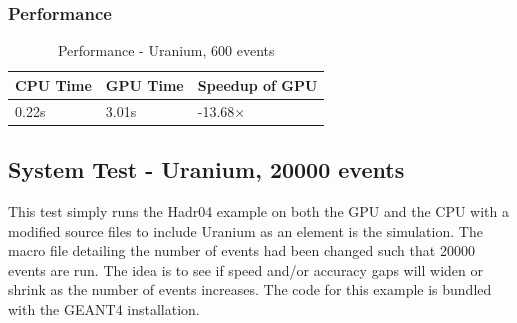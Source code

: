 \documentclass[12pt]{article}
\begin{document}
	\subsubsection{Performance}
		\begin{table}[H]
		\centering
		\caption{Performance - Uranium, 600 events}\label{sys4Perf}
		\begin{tabular}{lll}
		\toprule
		CPU Time& GPU Time&Speedup of GPU\\\midrule
		0.22s&3.01s&-13.68$\times$\\\bottomrule
		\end{tabular}
		\end{table}

\subsection{System Test - Uranium, 20000 events}
This test simply runs the Hadr04 example on both the GPU and the CPU with a modified source files to include Uranium as an element is the simulation. The macro file detailing the number of events had been changed such that 20000 events are run. The idea is to see if speed and/or accuracy gaps will widen or shrink as the number of events increases. The code for this example is bundled with the GEANT4 installation.
\end{document}
